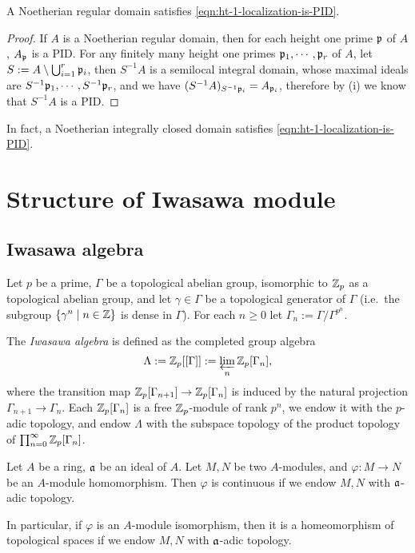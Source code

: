 \begin{prop}
\label{regular-domain-is-good}
A Noetherian regular domain satisfies \eqref{eqn:ht-1-localization-is-PID}.
\end{prop}

\begin{proof}
If $A$ is a Noetherian regular domain, then for each height one prime ${\mathfrak{p}}$ of $A$,
$A_{\mathfrak{p}}$ is a PID.
For any finitely many height one primes ${\mathfrak{p}}_1,\cdots,{\mathfrak{p}}_r$ of $A$,
let $S:=A\setminus\bigcup_{i=1}^r{\mathfrak{p}}_i$,
then $S^{-1}A$ is a semilocal integral domain, whose
maximal ideals are $S^{-1}{\mathfrak{p}}_1,\cdots,S^{-1}{\mathfrak{p}}_r$,
and we have $(S^{-1}A)_{S^{-1}{\mathfrak{p}}_i}=A_{{\mathfrak{p}}_i}$,
therefore by (i) we know that $S^{-1}A$ is a PID.
\end{proof}

\begin{remark}
In fact, a Noetherian integrally closed domain satisfies
\eqref{eqn:ht-1-localization-is-PID}.
\end{remark}

\section{Structure of Iwasawa module}

\subsection{Iwasawa algebra}

Let $p$ be a prime,
$\Gamma$ be a topological abelian group, isomorphic to ${\mathbb {Z}}_p$
as a topological abelian group, and let $\gamma\in\Gamma$ be a topological generator
of $\Gamma$ (i.e.~the subgroup $\{\gamma^n\mid n\in{\mathbb {Z}}\}$ is dense in $\Gamma$).
For each $n\geq 0$ let $\Gamma_n:=\Gamma/\Gamma^{p^n}$.

\begin{definition}
\label{Iwasawa-alg-defn}
The \emph{Iwasawa algebra} is defined as the completed group algebra
$$
\Lambda:={\mathbb {Z}}_p[[\Gamma]]:=\varprojlim_n{\mathbb {Z}}_p[\Gamma_n],
$$
where the transition map ${\mathbb {Z}}_p[\Gamma_{n+1}]\to
{\mathbb {Z}}_p[\Gamma_n]$ is induced by the natural projection
$\Gamma_{n+1}\to\Gamma_n$.
Each ${\mathbb {Z}}_p[\Gamma_n]$ is a free ${\mathbb {Z}}_p$-module of rank $p^n$,
we endow it with the $p$-adic topology,
and endow $\Lambda$ with the subspace topology
of the product topology of $\prod_{n=0}^\infty{\mathbb {Z}}_p[\Gamma_n]$.
\end{definition}

\begin{prop}
\label{linear-map-is-adic-continuous}
Let $A$ be a ring, ${\mathfrak{a}}$ be an ideal of $A$.
Let $M,N$ be two $A$-modules,
and $\varphi:M\to N$ be an $A$-module homomorphism.
Then $\varphi$ is continuous if we endow $M,N$ with ${\mathfrak{a}}$-adic topology.

In particular, if $\varphi$ is an $A$-module isomorphism,
then it is a homeomorphism of topological spaces if we endow $M,N$ with ${\mathfrak{a}}$-adic topology.
\end{prop}

